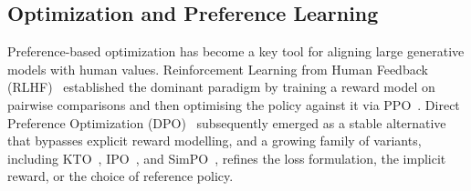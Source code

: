 \documentclass[lettersize,journal]{IEEEtran}
\begin{document}
\subsection{Optimization and Preference Learning}
Preference-based optimization has become a key tool for aligning large generative models with human values.
Reinforcement Learning from Human Feedback (RLHF)~\cite{ouyang2022training} established the dominant paradigm by training a reward model on pairwise comparisons and then optimising the policy against it via PPO~\cite{schulman2017proximal}.
Direct Preference Optimization (DPO)~\cite{rafailov2023direct} subsequently emerged as a stable alternative that bypasses explicit reward modelling, and a growing family of variants, including KTO~\cite{ethayarajh2024kto}, IPO~\cite{azar2024ipo}, and SimPO~\cite{meng2024simpo}, refines the loss formulation, the implicit reward, or the choice of reference policy.
\end{document}
